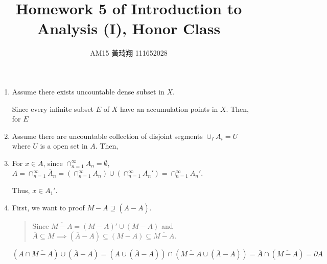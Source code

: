 \documentclass[12pt]{article}
\title{Homework 5 of Introduction to Analysis (I), Honor Class}
\author{AM15 黃琦翔 111652028}
\begin{document}
\maketitle
\begin{enumerate}
    \item Assume there exists uncountable dense subset in $X$.
    
    Since every infinite subset $E$ of $X$ have an accumulation points in $X$.
    Then, for $E$

    \item Assume there are uncountable collection of disjoint segments $\cup_I A_i = U$ where $U$ is a open set in $A$.
    Then, 

    \item For $x \in A$, since $\cap_{n=1}^{\infty} A_n = \emptyset$, $A = \cap_{n=1}^{\infty} \bar{A}_n = (\cap_{n=1}^{\infty} A_n) \cup (\cap_{n=1}^{\infty} A_n') = \cap_{n=1}^{\infty} A_n'$.
    
    Thus, $x \in A_1'$.

    \item First, we want to proof $\overline{M-A} \supseteq (\overline{A} - A)$.
    \begin{quote}
        Since $\overline{M-A} = (M-A)' \cup (M-A)$ and $\overline{A} \subseteq M\implies (\overline{A} - A) \subseteq (M - A) \subseteq \overline{M-A}$.
    \end{quote}
    
    $(A \cap \overline{M-A}) \cup (\overline{A} - A) = (A\cup (\overline{A}-A)) \cap (\overline{M-A} \cup (\overline{A} - A)) = \overline{A} \cap (\overline{M-A}) = \partial A$ 
\end{enumerate}
\end{document}
